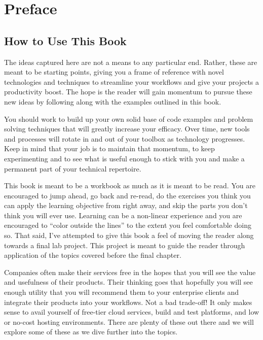 \chapter*{Preface}
\vspace{5mm}

\section{How to Use This Book}

\justifying
The ideas captured here are not a means to any particular end. Rather, these are meant to be starting points, giving
you a frame of reference with novel technologies and techniques to streamline your workflows and give your projects
a productivity boost. The hope is the reader will gain momentum to pursue these new ideas by following along with the
examples outlined in this book.

\justifying
You should work to build up your own solid base of code examples and problem solving techniques that will greatly increase
your efficacy. Over time, new tools and processes will rotate in and out of your toolbox as technology progresses. Keep
in mind that your job is to maintain that momentum, to keep experimenting and to see what is useful enough to stick with
you and make a permanent part of your technical repertoire.

\justifying
This book is meant to be a workbook as much as it is meant to be read. You are encouraged to jump ahead, go back and re-read,
do the exercises you think you can apply the learning objective from right away, and skip the parts you don't think you will
ever use. Learning can be a non-linear experience and you are encouraged to ``color outside the lines'' to the extent you feel
comfortable doing so. That said, I've attempted to give this book a feel of moving the reader
along towards a final lab project. This project is meant to guide the reader through application of the topics covered before 
the final chapter.

\justifying
Companies often make their services free in the hopes that you will see the value and usefulness of their products. Their
thinking goes that hopefully you will see enough utility that you will recommend them to your enterprise clients and
integrate their products into your workflows. Not a bad trade-off! It only makes sense to avail yourself of free-tier
cloud services, build and test platforms, and low or no-cost hosting environments. There are plenty of these out there and
we will explore some of these as we dive further into the topics.


